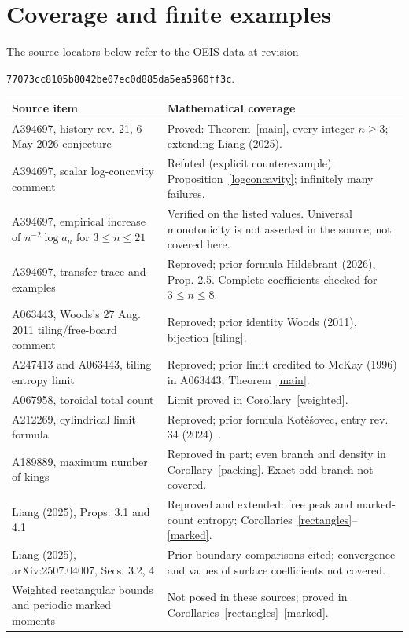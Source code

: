 \documentclass[10pt]{article}
\begin{document}
\section{Coverage and finite examples}
The source locators below refer to the OEIS data at revision
\begin{center}\small\texttt{77073cc8105b8042be07ec0d885da5ea5960ff3c}.\end{center}
\begin{center}\small
\begin{tabular}{@{}>{\raggedright\arraybackslash}p{.42\linewidth}>{\raggedright\arraybackslash}p{.52\linewidth}@{}}
\toprule
Source item & Mathematical coverage\\
\midrule
A394697, history rev. 21, 6 May 2026 conjecture & Proved: Theorem~\ref{main}, every integer $n\geq3$; extending Liang (2025).\\
A394697, scalar log-concavity comment & Refuted (explicit counterexample): Proposition~\ref{logconcavity}; infinitely many failures.\\
A394697, empirical increase of $n^{-2}\log a_n$ for $3\leq n\leq21$ & Verified on the listed values. Universal monotonicity is not asserted in the source; not covered here.\\
A394697, transfer trace and examples & Reproved; prior formula Hildebrant (2026), Prop. 2.5. Complete coefficients checked for $3\leq n\leq8$.\\
A063443, Woods's 27 Aug. 2011 tiling/free-board comment & Reproved; prior identity Woods (2011), bijection \eqref{tiling}.\\
A247413 and A063443, tiling entropy limit & Reproved; prior limit credited to McKay (1996) in A063443; Theorem~\ref{main}.\\
A067958, toroidal total count & Limit proved in Corollary~\ref{weighted}.\\
A212269, cylindrical limit formula & Reproved; prior formula Kot\v{e}\v{s}ovec, entry rev. 34 (2024)~\cite{boundaries}.\\
A189889, maximum number of kings & Reproved in part; even branch and density in Corollary~\ref{packing}. Exact odd branch not covered.\\
Liang (2025), Props. 3.1 and 4.1 & Reproved and extended: free peak and marked-count entropy; Corollaries~\ref{rectangles}--\ref{marked}.\\
Liang (2025), arXiv:2507.04007, Secs. 3.2, 4 & Prior boundary comparisons cited; convergence and values of surface coefficients not covered.\\
Weighted rectangular bounds and periodic marked moments & Not posed in these sources; proved in Corollaries~\ref{rectangles}--\ref{marked}.\\
\bottomrule
\end{tabular}
\end{center}
\end{document}
